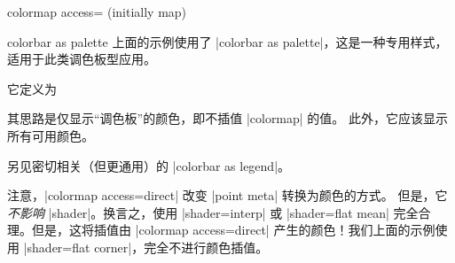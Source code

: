 \begin{pgfplotskey}{colormap access= (initially map)%
}
    \begin{pgfplotskey}{colorbar as palette}
        上面的示例使用了 |colorbar as palette|，这是一种专用样式，
        适用于此类调色板型应用。

        它定义为
\begin{codeexample}
\end{codeexample}
        其思路是仅显示``调色板''的颜色，即不插值 |colormap| 的值。
        此外，它应该显示所有可用颜色。

        另见密切相关（但更通用）的 |colorbar as legend|。
\end{pgfplotskey}

    注意，|colormap access=direct| 改变 |point meta| 转换为颜色的方式。
    但是，它\emph{不影响} |shader|。换言之，使用 |shader=interp| 或
    |shader=flat mean| 完全合理。但是，这将插值由
    |colormap access=direct| 产生的颜色！我们上面的示例使用
    |shader=flat corner|，完全不进行颜色插值。


\end{pgfplotskey}
